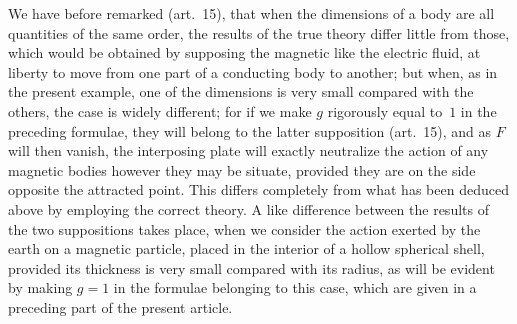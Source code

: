 \documentclass[12pt,notitlepage]{amsart}
\begin{document}
We have before remarked (art.~15), that when the dimensions of a
body are all quantities of the same order, the results of the true theory differ
little from those, which would be obtained by supposing the magnetic like the
electric fluid,
at liberty to move from one part of a conducting body to another;
but when, as in the present example, one of the dimensions is very small
compared with the others, the case is widely different; for if we make $g$
rigorously equal to~$1$ in the preceding formulae,
they will belong to the latter
supposition (art.~15), and as $F$ will then vanish, the interposing plate will
exactly neutralize the action of any magnetic bodies however they may be
situate, provided they are on the side opposite the attracted point.
This differs
completely from what has been deduced above by employing the correct
theory. A like difference between the results of the two suppositions takes
place, when we consider the action exerted by the earth on a magnetic
particle, placed in the interior of a hollow spherical shell, provided its
thickness is very small compared with its radius, as will be evident by making
$g=1$ in the formulae belonging to this case, which are given in a preceding
part of the present article.
\bigskip
\end{document}
